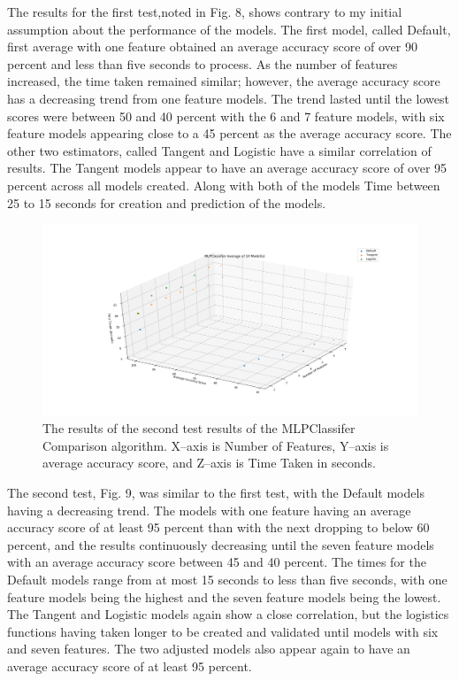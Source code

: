 \documentclass[a4paper, 12pt]{article}
\begin{document}
\begin{paragraph}
\indent The results for the first test,noted in Fig. 8, shows contrary to my initial assumption about the performance of the models. The first model, called Default, first average with one feature obtained an average accuracy score of over 90 percent and less than five seconds to process. As the number of features increased, the time taken remained similar; however, the average accuracy score has a decreasing trend from one feature models. The trend lasted until the lowest scores were between 50 and 40 percent with the 6 and 7 feature models, with six feature models appearing close to a 45 percent as the average accuracy score. The other two estimators, called Tangent and Logistic have a similar correlation of results. The Tangent models appear to have an average accuracy score of over 95 percent across all models created. Along with both of the models Time between 25 to 15 seconds for creation and prediction of the models.
\par

\begin{figure}[!h]
\centering
\includegraphics[scale=0.37]{Test_2}
\caption{ The results of the second test results of the MLPClassifer Comparison algorithm. X--axis is Number of Features, Y--axis is average accuracy score, and Z--axis is Time Taken in seconds.}
\end{figure}

The second test, Fig. 9, was similar to the first test, with the Default models having a decreasing trend. The models with one feature having an average accuracy score of at least 95 percent than with the next dropping to below 60 percent, and the results continuously decreasing until the seven feature models with an average accuracy score between 45 and 40 percent. The times for the Default models range from at most 15 seconds to less than five seconds, with one feature models being the highest and the seven feature models being the lowest. The Tangent and Logistic models again show a close correlation, but the logistics functions having taken longer to be created and validated until models with six and seven features. The two adjusted models also appear again to have an average accuracy score of at least 95 percent.
\par


\end{paragraph}
\end{document}
